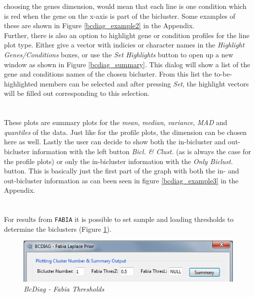 \documentclass[a4paper]{article}\usepackage[]{graphicx}\usepackage[]{color}
\begin{document}
choosing the genes dimension, would mean that each line is one condition which
is red when the gene on the x-axis is part of the bicluster. Some examples of these
are shown in Figure \ref{bcdiag_example2} in the Appendix.\\
Further, there is also an option to highlight gene or condition profiles for the
line plot type. Either give a vector with indicies or character names in the
{\it Highlight Genes/Conditions} boxes, or use the {\it Set Highlights} button
to open up a new window as shown in Figure \ref{bcdiag_summary}. This dialog
will show a list of the gene and conditions names of the chosen
bicluster. From this list the to-be-highlighted members can be selected and
after pressing {\it Set}, the highlight vectors will be filled out corresponding
to this selection.
\\
\\
\\
These plots are summary plots for the {\it mean}, {\it median}, {\it variance},
{\it MAD} and {\it quantiles} of the data. Just like for the profile plots, the
dimension can be chosen here as well. Lastly the user can decide to show both
the in-bicluster and out-bicluster information with the left button {\it Bicl. \& Clust.} (as is
always the case for the profile plots) or only the in-bicluster information with
the {\it Only Biclust.} button. This is basically just the first part of the graph
with both the in- and out-bicluster information as can been seen in figure
\ref{bcdiag_example3} in the Appendix.
\\ \\
\\
For results from \verb|FABIA| it is possible to set sample and loading
thresholds to determine the biclusters (Figure \ref{bcdiag_fabia}).
\begin{figure}[H]
\centering
\includegraphics[scale=0.5]{figures/bcdiag_fabia.png}
\caption{{\it BcDiag - Fabia Thresholds}\label{bcdiag_fabia}}
\end{figure}
\end{document}

